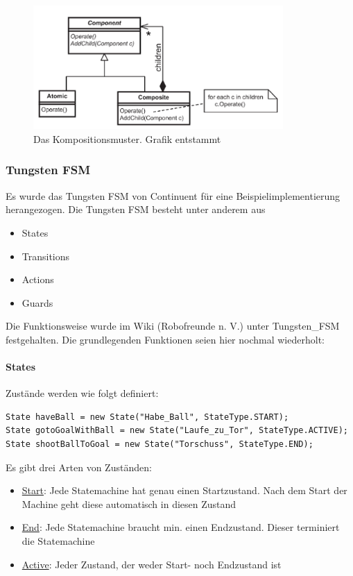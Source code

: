 \documentclass[fontsize=12pt,a4paper,final]{scrartcl}[2003/01/01]
\begin{document}
\begin{figure}[ht]
	\centering
  \includegraphics[width=0.85\textwidth]{Grafiken/KI/goal-driven.png}
	\caption{Das Kompositionsmuster. Grafik entstammt \cite[S. 383]{buckland2005programming}}
	\label{fig2}
\end{figure}

\subsubsection{Tungsten FSM}
Es wurde das Tungsten FSM von Continuent für eine Beispielimplementierung herangezogen. Die Tungsten FSM besteht unter anderem aus
\begin{itemize}
 \item States
 \item Transitions
 \item Actions
 \item Guards
\end{itemize}
Die Funktionsweise wurde im Wiki (Robofreunde n. V.) unter Tungsten\_FSM festgehalten. Die grundlegenden Funktionen seien hier nochmal wiederholt:

\paragraph{States}
Zustände werden wie folgt definiert:
\begin{lstlisting}
State haveBall = new State("Habe_Ball", StateType.START);
State gotoGoalWithBall = new State("Laufe_zu_Tor", StateType.ACTIVE);
State shootBallToGoal = new State("Torschuss", StateType.END);
\end{lstlisting}
Es gibt drei Arten von Zuständen:
\begin{itemize}
 \item \underline{Start}: Jede Statemachine hat genau einen Startzustand. Nach dem Start der Machine geht diese automatisch in diesen Zustand
 \item \underline{End}: Jede Statemachine braucht min. einen Endzustand. Dieser terminiert die Statemachine
 \item \underline{Active}: Jeder Zustand, der weder Start- noch Endzustand ist
\end{itemize}
\end{document}
